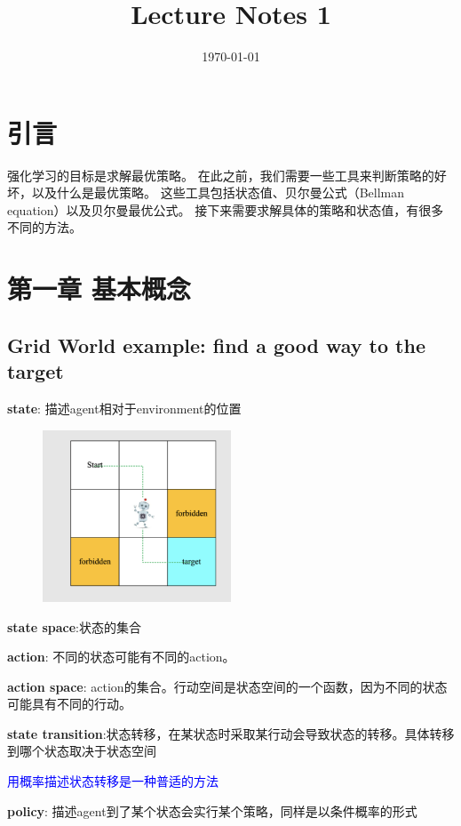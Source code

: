 \documentclass{article}
\begin{document}
\title{Lecture Notes 1}
\author{}
\date{\today}
\maketitle
\section{引言}
强化学习的目标是求解最优策略。
在此之前，我们需要一些工具来判断策略的好坏，以及什么是最优策略。
这些工具包括状态值、贝尔曼公式（Bellman equation）以及贝尔曼最优公式。 
接下来需要求解具体的策略和状态值，有很多不同的方法。
\section{第一章 基本概念}
\subsection{Grid World example: find a \textbf{good} way to the target}

\textbf{state}: 描述agent相对于environment的位置
\begin{figure}[htbp]
    \center{}
    \includegraphics[width=0.5\textwidth]{picture1.png}
    \center{}
\end{figure}

\textbf{state space}:状态的集合

\textbf{action}: 不同的状态可能有不同的action。

\textbf{action space}: action的集合。行动空间是状态空间的一个函数，因为不同的状态可能具有不同的行动。

\textbf{state transition}:状态转移，在某状态时采取某行动会导致状态的转移。具体转移到哪个状态取决于状态空间

\textcolor{blue}{\kaishu*用概率描述状态转移是一种普适的方法}

\textbf{policy}: 描述agent到了某个状态会实行某个策略，同样是以条件概率的形式
\end{document}

